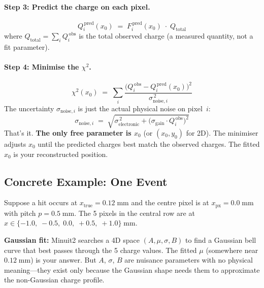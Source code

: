 \documentclass[11pt,a4paper]{article}
\begin{document}
\paragraph{Step 3: Predict the charge on each pixel.}
\begin{equation}
  Q_i^{\,\text{pred}}(x_0)
    \;=\; F_i^{\,\text{pred}}(x_0) \;\cdot\; Q_{\text{total}}
  \label{eq:predicted-charge}
\end{equation}
where $Q_{\text{total}} = \sum_i Q_i^{\,\text{obs}}$ is the total
observed charge (a measured quantity, not a fit parameter).

\paragraph{Step 4: Minimise the $\chi^{2}$.}
\begin{equation}
  \chi^{2}(x_0)
    \;=\; \sum_{i}
      \frac{\bigl(Q_i^{\,\text{obs}} - Q_i^{\,\text{pred}}(x_0)\bigr)^{2}}
           {\sigma_{\text{noise},i}^{\,2}}
  \label{eq:phys-chi2}
\end{equation}
The uncertainty $\sigma_{\text{noise},i}$ is just the actual physical
noise on pixel~$i$:
\begin{equation}
  \sigma_{\text{noise},i}
    \;=\; \sqrt{\sigma_{\text{electronic}}^{\,2}
                + \bigl(\sigma_{\text{gain}} \cdot Q_i^{\,\text{obs}}\bigr)^{2}}
  \label{eq:noise}
\end{equation}
That's it.  \textbf{The only free parameter is $x_0$} (or $(x_0, y_0)$
for 2D).  The minimiser adjusts $x_0$ until the predicted charges best
match the observed charges.  The fitted $x_0$ is your reconstructed
position.

\subsection{Concrete Example: One Event}
\label{sec:example}

Suppose a hit occurs at $x_{\text{true}} = 0.12\;\text{mm}$ and the
centre pixel is at $x_{\text{px}} = 0.0\;\text{mm}$ with pitch
$p = 0.5\;\text{mm}$.  The 5 pixels in the central row are at
$x \in \{-1.0,\; -0.5,\; 0.0,\; +0.5,\; +1.0\}\;\text{mm}$.

\medskip\noindent
\textbf{Gaussian fit:} Minuit2 searches a 4D space $(A, \mu, \sigma, B)$
to find a Gaussian bell curve that best passes through the 5 charge
values.  The fitted $\mu$ (somewhere near $0.12\;\text{mm}$) is your
answer.  But $A$, $\sigma$, $B$ are nuisance parameters with no physical
meaning---they exist only because the Gaussian shape needs them to
approximate the non-Gaussian charge profile.
\end{document}
